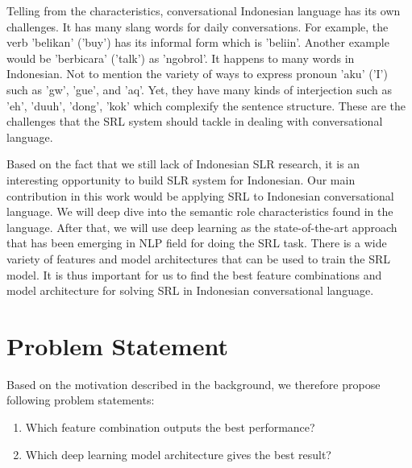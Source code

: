 Telling from the characteristics, conversational Indonesian language has its own challenges. It has many slang words for daily conversations. For example, the verb 'belikan' ('buy') has its informal form which is 'beliin'. Another example would be 'berbicara' ('talk') as 'ngobrol'. It happens to many words in Indonesian. Not to mention the variety of ways to express pronoun 'aku' ('I') such as 'gw', 'gue', and 'aq'. Yet, they have many kinds of interjection such as 'eh', 'duuh', 'dong', 'kok' which complexify the sentence structure. These are the challenges that the SRL system should tackle in dealing with conversational language.

Based on the fact that we still lack of Indonesian SLR research, it is an interesting opportunity to build SLR system for Indonesian. Our main contribution in this work would be applying SRL to Indonesian conversational language. We will deep dive into the semantic role characteristics found in the language. After that, we will use deep learning as the state-of-the-art approach that has been emerging in NLP field for doing the SRL task. There is a wide variety of features and model architectures that can be used to train the SRL model. It is thus important for us to find the best feature combinations and model architecture for solving SRL in Indonesian conversational language.


\section{Problem Statement}
Based on the motivation described in the background, we therefore propose following problem statements:
\begin{enumerate}
	\item Which feature combination outputs the best performance?
	\item Which deep learning model architecture gives the best result?
\end{enumerate}

